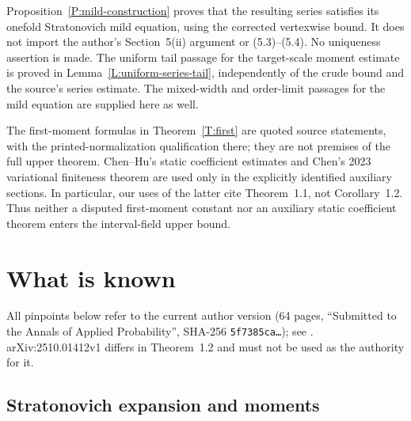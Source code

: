 \documentclass[12pt]{article}
\numberwithin{equation}{section}
\theoremstyle{definition}
\begin{document}
Proposition~\ref{P:mild-construction} proves that the resulting series
satisfies its onefold Stratonovich mild equation, using the corrected
vertexwise bound. It does not import the author's Section~5(ii) argument
or (5.3)--(5.4). No uniqueness assertion is made. The uniform tail passage
for the target-scale moment estimate is proved in
Lemma~\ref{L:uniform-series-tail}, independently of the crude bound and
the source's series estimate. The mixed-width and order-limit passages
for the mild equation are supplied here as well.

The first-moment formulas in Theorem~\ref{T:first} are quoted source
statements, with the printed-normalization qualification there; they are
not premises of the full upper theorem. Chen--Hu's static coefficient
estimates and Chen's 2023 variational finiteness theorem are used only in
the explicitly identified auxiliary sections. In particular, our uses of
the latter cite Theorem~1.1, not Corollary~1.2. Thus neither a disputed
first-moment constant nor an auxiliary static coefficient theorem enters
the interval-field upper bound.

\section{What is known}\label{S:known}

All pinpoints below refer to the current author version
\cite{chen:author2026:time-dependency} (64 pages, ``Submitted to the Annals
of Applied Probability'', SHA-256 \texttt{5f7385ca\dots}); see
. arXiv:2510.01412v1
\cite{chen:25:time-dependency} differs in Theorem~1.2 and must not be used as
the authority for it.

\subsection{Stratonovich expansion and moments}
\end{document}
